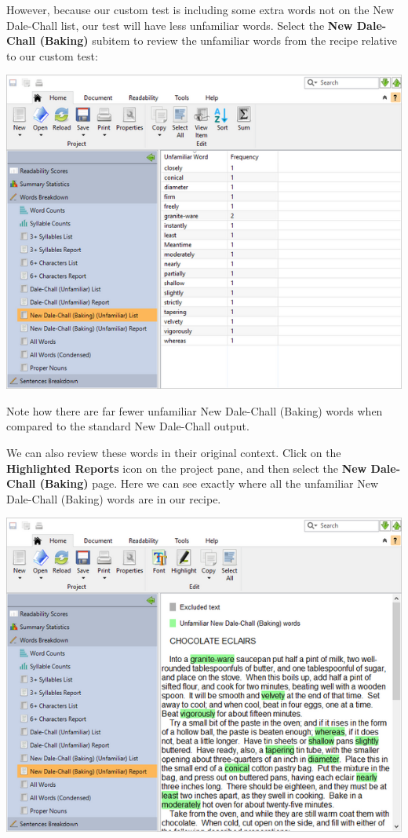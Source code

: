 \documentclass[
]{book}
\theoremstyle{definition}
\theoremstyle{definition}
\theoremstyle{definition}
\theoremstyle{definition}
\theoremstyle{remark}
\begin{document}
However, because our custom test is including some extra words not on the New Dale-Chall list, our test will have less unfamiliar words. Select the \textbf{New Dale-Chall (Baking)} subitem to review the unfamiliar words from the recipe relative to our custom test:

\includegraphics{Images/CustomTestExample2CustomWordList.png}

Note how there are far fewer unfamiliar New Dale-Chall (Baking) words when compared to the standard New Dale-Chall output.

We can also review these words in their original context. Click on the \textbf{Highlighted Reports} icon on the project pane, and then select the \textbf{New Dale-Chall (Baking)} page. Here we can see exactly where all the unfamiliar New Dale-Chall (Baking) words are in our recipe.

\includegraphics{Images/CustomTestExample2CustomText.png}
\end{document}
